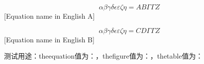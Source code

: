 \begin{equation}
\alpha\beta\gamma\delta\epsilon\varepsilon\zeta\eta = AB\Gamma\varGamma Z
\end{equation}[Equation name in English A]

\begin{equation}
\alpha\beta\gamma\delta\epsilon\varepsilon\zeta\eta = CD\Gamma\varGamma Z
\end{equation}[Equation name in English B]

测试用途：theequation值为：\theequation ，thefigure值为：\thefigure ，thetable值为：\thetable
